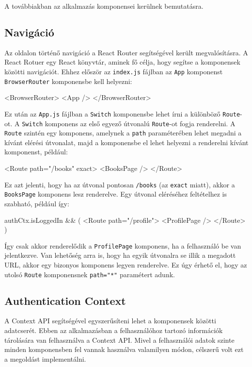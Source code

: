 A továbbiakban az alkalmazás komponensei kerülnek bemutatásra.

\subsection{Navigáció}

Az oldalon történő navigáció a React Router segítségével került megvalósításra. A React Rotuer egy React könyvtár, aminek fő célja, hogy segítse a komponensek közötti navigációt. Ehhez először az \texttt{index.js} fájlban az \texttt{App} komponenst \texttt{BrowserRouter} komponensbe kell helyezni:  
\begin{java}
<BrowserRouter>
  <App />
</BrowserRouter>     
\end{java}
Ez után az \texttt{App.js} fájlban a \texttt{Switch} komponensbe lehet írni a különböző \texttt{Route}-ot. A \texttt{Switch} komponens az első egyező útvonalú \texttt{Route}-ot fogja renderelni. A \texttt{Route} szintén egy komponens, amelynek a \texttt{path} paraméterében lehet megadni a kívánt elérési útvonalat, majd a komponensbe el lehet helyezni a renderelni kívánt komponenst, például: 
\begin{java}
<Route path="/books" exact>
  <BooksPage />
</Route>    
\end{java}
Ez azt jelenti, hogy ha az útvonal pontosan \texttt{/books} (az \texttt{exact} miatt), akkor a \\ \texttt{BooksPage} komponens lesz renderelve. Egy útvonal eléréséhez feltételhez is szabható, például így:
\begin{java}
{authCtx.isLoggedIn && (
  <Route path="/profile">
    <ProfilePage />
  </Route>
)}
\end{java}
Így csak akkor renderelődik a \texttt{ProfilePage} komponens, ha a felhasználó be van jelentkezve. Van lehetőség arra is, hogy ha egyik útvonalra se illik a megadott URL, akkor egy bizonyos komponens legyen renderelve. Ez úgy érhető el, hogy az utolsó \texttt{Route} komponensnek \texttt{path="*"} paramétert adunk.

\subsection{Authentication Context}

A Context API segítségével egyszerűsíteni lehet a komponensek közötti adatcserét. Ebben az alkalmazásban a felhasználóhoz tartozó információk tárolására van felhasználva a Context API. Mivel a felhasználói adatok szinte minden komponensben fel vannak használva valamilyen módon, célszerű volt ezt a megoldást implementálni. 


